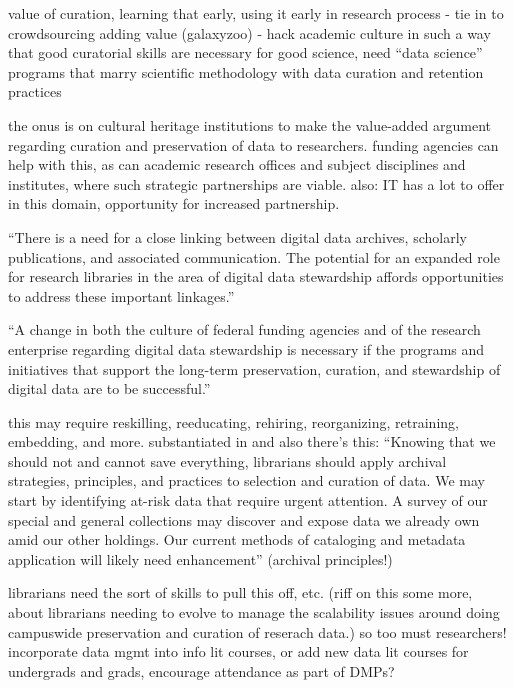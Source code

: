 \documentclass{acm_proc_article-sp}
\begin{document}
value of curation, learning that early, using it early in research process -
tie in to crowdsourcing adding value (galaxyzoo) - hack academic culture in
such a way that good curatorial skills are necessary for good science, need
``data science'' programs that marry scientific methodology with data curation
and retention practices \cite{uw:datascience}

the onus is on cultural heritage institutions to make the value-added
argument regarding curation and preservation of data to researchers.
funding agencies can help with this, as can academic research offices
and subject disciplines and institutes, where such strategic
partnerships are viable.  also: IT has a lot to offer in this domain,
opportunity for increased partnership.

``There is a need for a close linking between digital data archives,
scholarly publications, and associated communication. The potential
for an expanded role for research libraries in the area of digital
data stewardship affords opportunities to address these important
linkages.'' \cite{arl:stewardship}

``A change in both the culture of federal funding agencies
and of the research enterprise regarding digital data stewardship is
necessary if the programs and initiatives that support the long-term
preservation, curation, and stewardship of digital data are to be
successful.'' \cite{arl:stewardship}

this may require reskilling, reeducating, rehiring, reorganizing,
retraining, embedding, and more. substantiated in \cite{jisc:deluge}
and also there's this: ``Knowing that we should not and cannot save
everything, librarians should apply archival strategies, principles,
and practices to selection and curation of data. We may start by
identifying at-risk data that require urgent attention. A survey of
our special and general collections may discover and expose data we
already own amid our other holdings. Our current methods of cataloging
and metadata application will likely need enhancement''
\cite{ogburn:imperative} (archival principles!)

librarians need the sort of skills to pull this off, etc. (riff on
this some more, about librarians needing to evolve to manage the
scalability issues around doing campuswide preservation and curation
of reserach data.) so too must researchers!  incorporate data mgmt
into info lit courses, or add new data lit courses for undergrads and
grads, encourage attendance as part of DMPs?
\end{document}
